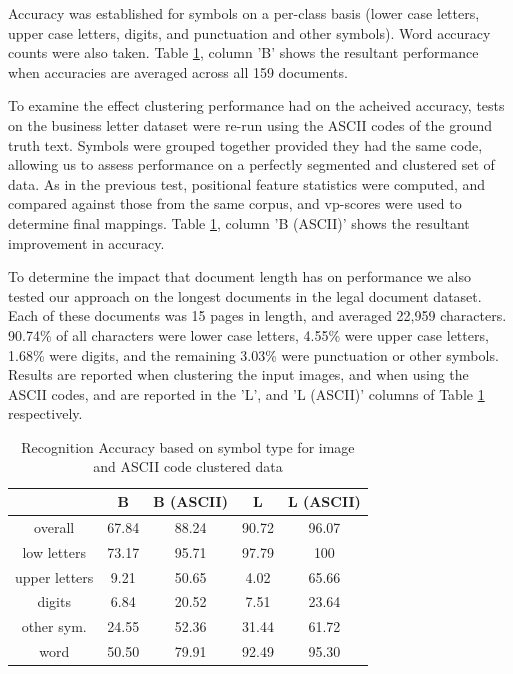 \documentclass[times, 10pt,twocolumn]{article}
\begin{document}
Accuracy was established for symbols on a per-class basis (lower case letters, 
upper case letters, digits, and punctuation and other symbols).  Word accuracy
counts were also taken.  Table \ref{acc_tbl}, column 'B' shows the 
resultant performance when accuracies are averaged across all 159 documents.

To examine the effect clustering performance had on the acheived accuracy,
tests on the business letter dataset were re-run using the ASCII codes of the
ground truth text.  Symbols were grouped together provided they had the same
code, allowing us to assess performance on a perfectly segmented and clustered 
set of data.  As in the previous test, positional feature statistics were
computed, and compared against those from the same corpus, and vp-scores were
used to determine final mappings.  Table \ref{acc_tbl}, column 'B (ASCII)'
shows the resultant improvement in accuracy.

To determine the impact that document length has on performance we also tested 
our approach on the longest documents in the legal document dataset.  Each of 
these documents was 15 pages in length, and averaged 22,959 characters.
90.74\% of all characters were lower case letters, 4.55\% were upper case 
letters, 1.68\% were digits, and the remaining 3.03\% were punctuation or 
other symbols.  Results are reported when clustering the input images, and 
when using the ASCII codes, and are reported in the 'L', and 'L (ASCII)' 
columns of Table \ref{acc_tbl} respectively.

\begin{table}[ht]
  \begin{tabular}{|c|c|c|c|c|}
    \hline
    & B & B (ASCII) & L & L (ASCII)\\
    \hline
    \hline
    overall & 67.84 & 88.24 & 90.72 & 96.07\\
    \hline
    low letters & 73.17 & 95.71 & 97.79 & 100\\
    \hline
    upper letters & 9.21 & 50.65 & 4.02 & 65.66\\
    \hline
    digits & 6.84 & 20.52 & 7.51 & 23.64\\
    \hline
    other sym. & 24.55 & 52.36 & 31.44 & 61.72\\
    \hline
    word & 50.50 & 79.91 & 92.49 & 95.30\\
    \hline
  \end{tabular}
  \caption{Recognition Accuracy based on symbol type for image and ASCII code
           clustered data}
  \label{acc_tbl}
\end{table}
\end{document}
